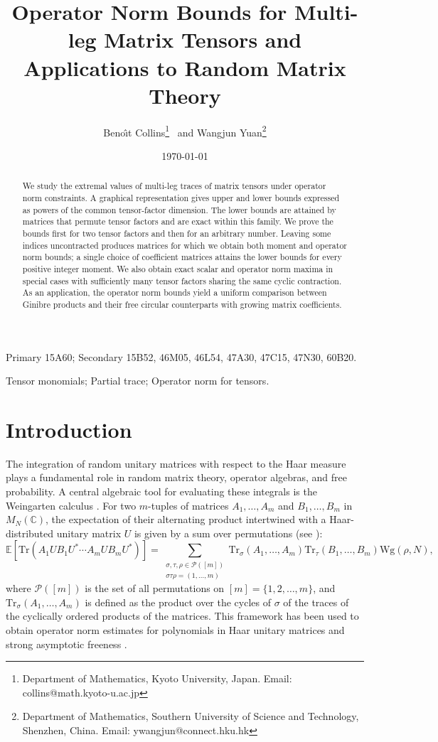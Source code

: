 \documentclass[12pt]{article}
\title{Operator Norm Bounds for Multi-leg Matrix Tensors and Applications to Random Matrix Theory}
\author{
Beno\^\i{}t Collins\thanks{Department of Mathematics, Kyoto University, Japan. Email: collins@math.kyoto-u.ac.jp}
\, and
Wangjun Yuan\thanks{Department of Mathematics, Southern University of Science and Technology, Shenzhen, China. Email: ywangjun@connect.hku.hk}
}
\date{\today}
\numberwithin{equation}{section}
\theoremstyle{plain}
\def\bE{\mathbb E}
\def\bC{\mathbb C}
\def\cP{\mathcal P}
\def\Tr{\mathrm {Tr}}
\def\Wg{\mathrm {Wg}}
\begin{document}
\maketitle

\begin{abstract}
We study the extremal values of multi-leg traces of matrix tensors under operator norm constraints. A graphical representation gives upper and lower bounds expressed as powers of the common tensor-factor dimension. The lower bounds are attained by matrices that permute tensor factors and are exact within this family. We prove the bounds first for two tensor factors and then for an arbitrary number. Leaving some indices uncontracted produces matrices for which we obtain both moment and operator norm bounds; a single choice of coefficient matrices attains the lower bounds for every positive integer moment. We also obtain exact scalar and operator norm maxima in special cases with sufficiently many tensor factors sharing the same cyclic contraction. As an application, the operator norm bounds yield a uniform comparison between Ginibre products and their free circular counterparts with growing matrix coefficients.
\end{abstract}

 Primary 15A60; Secondary 15B52, 46M05, 46L54, 47A30, 47C15, 47N30, 60B20.

\medskip

Tensor monomials; Partial trace; Operator norm for tensors.

\section{Introduction}

The integration of random unitary matrices with respect to the Haar measure plays a fundamental role in random matrix theory, operator algebras, and free probability. A central algebraic tool for evaluating these integrals is the Weingarten calculus \cite{MR4415894,MR4680355}. For two $m$-tuples of matrices $A_1, \ldots, A_m$ and $B_1, \ldots, B_m$ in $M_N(\bC)$, the expectation of their alternating product intertwined with a Haar-distributed unitary matrix $U$ is given by a sum over permutations (see \cite[Corollary~2.4]{CollinsSnady2006}):
$$ \bE \left[ \Tr \left( A_1 U B_1 U^* \cdots A_m U B_m U^* \right) \right] = \sum_{\substack{\sigma, \tau, \rho \in \cP([m]) \\ \sigma\tau\rho = (1, \ldots, m)}} \Tr_\sigma(A_1, \ldots, A_m) \Tr_\tau(B_1, \ldots, B_m) \Wg(\rho, N), $$
where $\cP([m])$ is the set of all permutations on $[m] = \{1,2,\ldots,m\}$, and $\Tr_\sigma(A_1, \ldots, A_m)$ is defined as the product over the cycles of $\sigma$ of the traces of the cyclically ordered products of the matrices. This framework has been used to obtain operator norm estimates for polynomials in Haar unitary matrices \cite{BordenaveCollins2023} and strong asymptotic freeness \cite{MR4756991}.
\end{document}
